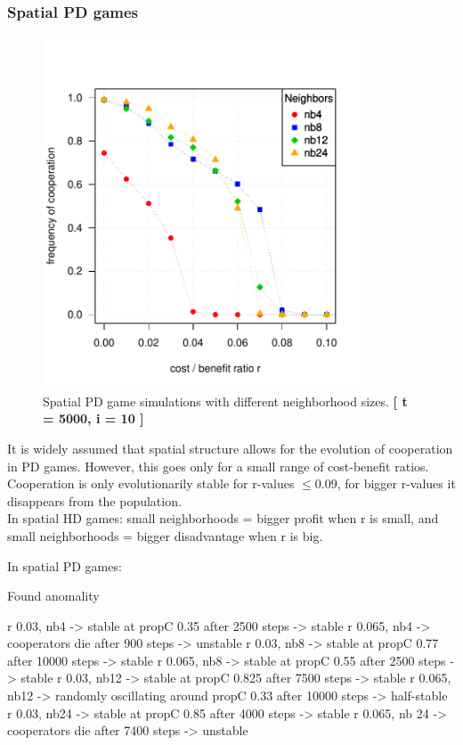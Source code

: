 \subsubsection*{Spatial PD games}





\begin{figure}[H]
	\centering 
	\includegraphics[width=9.5cm]{task2_multiplot}
	\caption{Spatial PD game simulations with different neighborhood sizes.  \textbf{[ t = 5000, i = 10 ]} }\label{fig: task2_multiplot}
\end{figure}


It is widely assumed that spatial structure allows for the evolution of cooperation in PD games. However, this goes only for a small range of cost-benefit ratios. Cooperation is only evolutionarily stable for r-values $ \leq 0.09$, for bigger r-values it disappears from the population.\\
 
In spatial HD games: small neighborhoods = bigger profit when r is small, and small neighborhoods = bigger disadvantage when r is big.

In spatial PD games: 

Found anomality

r 0.03, nb4 -> stable at propC 0.35 after 2500 steps -> stable
r 0.065, nb4 -> cooperators die after 900 steps -> unstable
r 0.03, nb8 -> stable at propC 0.77 after 10000 steps -> stable
r 0.065, nb8 -> stable at propC 0.55 after 2500 steps -> stable
r 0.03, nb12 -> stable at propC 0.825 after 7500 steps -> stable
r 0.065, nb12 -> randomly oscillating around propC 0.33 after 10000 steps -> half-stable
r 0.03, nb24 -> stable at propC 0.85 after 4000 steps -> stable
r 0.065, nb 24 -> cooperators die after 7400 steps -> unstable

